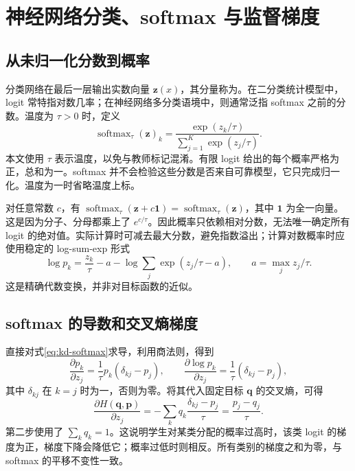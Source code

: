 \documentclass[UTF8,12pt,a4paper,fontset=fandol]{ctexart}
\begin{document}
\section{神经网络分类、softmax 与监督梯度}
\label{sec:kd-softmax}

\subsection{从未归一化分数到概率}
分类网络在最后一层输出实数向量 $\mathbf z(x)$，其分量称为。在二分类统计模型中，logit 常特指对数几率；在神经网络多分类语境中，则通常泛指 softmax 之前的分数。温度为 $\tau>0$ 时，定义
\begin{equation}
 \operatorname{softmax}_\tau(\mathbf z)_k
 =\frac{\exp(z_k/\tau)}{\sum_{j=1}^K\exp(z_j/\tau)}.
 \label{eq:kd-softmax}
\end{equation}
本文使用 $\tau$ 表示温度，以免与教师标记混淆。有限 logit 给出的每个概率严格为正，总和为一。softmax 并不会检验这些分数是否来自可靠模型，它只完成归一化。温度为一时省略温度上标。

对任意常数 $c$，有 $\operatorname{softmax}_\tau(\mathbf z+c\mathbf1)=\operatorname{softmax}_\tau(\mathbf z)$，其中 $\mathbf1$ 为全一向量。这是因为分子、分母都乘上了 $e^{c/\tau}$。因此概率只依赖相对分数，无法唯一确定所有 logit 的绝对值。实际计算时可减去最大分数，避免指数溢出；计算对数概率时应使用稳定的 log-sum-exp 形式
\[
 \log p_k=\frac{z_k}{\tau}-a-\log\sum_j\exp(z_j/\tau-a),
 \qquad a=\max_j z_j/\tau.
\]
这是精确代数变换，并非对目标函数的近似。

\subsection{softmax 的导数和交叉熵梯度}
直接对式\eqref{eq:kd-softmax}求导，利用商法则，得到
\begin{equation}
 \frac{\partial p_k}{\partial z_j}
 =\frac1\tau p_k(\delta_{kj}-p_j),\qquad
 \frac{\partial\log p_k}{\partial z_j}
 =\frac1\tau(\delta_{kj}-p_j),
 \label{eq:kd-softmax-derivative}
\end{equation}
其中 $\delta_{kj}$ 在 $k=j$ 时为一，否则为零。将其代入固定目标 $\mathbf q$ 的交叉熵，可得
\begin{equation}
 \frac{\partial H(\mathbf q,\mathbf p)}{\partial z_j}
 =-\sum_kq_k\frac{\delta_{kj}-p_j}{\tau}
 =\frac{p_j-q_j}{\tau}.
 \label{eq:kd-soft-gradient}
\end{equation}
第二步使用了 $\sum_kq_k=1$。这说明学生对某类分配的概率过高时，该类 logit 的梯度为正，梯度下降会降低它；概率过低时则相反。所有类别的梯度之和为零，与 softmax 的平移不变性一致。
\end{document}
